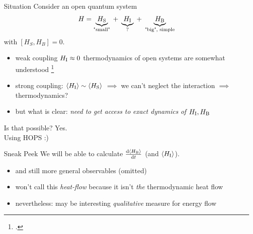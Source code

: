 \documentclass[10pt, aspectratio=169]{beamer}
\begin{document}
\begin{frame}
  \begin{block}{Situation}
    Consider an open quantum system
    \begin{equation}
      \label{eq:openthermo}
      H=\underbrace{H_{\mathrm{S}}}_{\text{"small"}}\; +\;
      \underbrace{H_{\mathrm{I}}}_{\mathrm{?}} \;+\;
      \underbrace{H_{\mathrm{B}}}_{\text{"big", simple}}
    \end{equation}
    with \([H_S, H_B] = 0\).
  \end{block}
  \pause
  \begin{itemize}[<+->]
  \item weak coupling \(H_{\mathrm{I}}\approx 0\)
    thermodynamics of open systems
    are somewhat understood \footcite{Rivas2019Oct,Talkner2020Oct}
  \item strong coupling: \(\ev{H_\inter} \sim \ev{H_\sys}\)
    \(\implies\) we can't neglect the interaction \(\implies\)
    thermodynamics?
  \item but what is clear: \emph{need to get access to exact dynamics
      of \(H_{\mathrm{I}},H_{\mathrm{B}}\)}
  \end{itemize}
\end{frame}
\begin{frame}
  \begin{center}
    \huge{Is that possible? \pause{}Yes.}\\\pause{}
    \huge{Using HOPS :)}
    \pause{}
  \end{center}
  \begin{block}{Sneak Peek}
      We will be able to calculate
      \(\dv{\ev{H_\bath}}{t}\) (and \(\ev{H_\inter}\)).
      \begin{itemize}
      \item and still more general observables (omitted)
      \end{itemize}
  \end{block}
  \pause{}
  \begin{itemize}[<+->]
  \item won't call this \emph{heat-flow} because it isn't
    \emph{the} thermodynamic heat flow
  \item nevertheless: may be interesting \emph{qualitative} measure
    for energy flow
  \end{itemize}
\end{frame}
\end{document}
